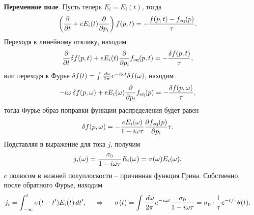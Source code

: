 \textbf{Переменное поле}. Пусть теперь $E_i = E_i (t)$, тогда
\begin{equation*}
	\left(
		\frac{\partial }{\partial t} + e E_i (t) \frac{\partial }{\partial p_i} 
	\right) f(p, t) = - \frac{f(p, t) - f_{\textnormal{eq}} (p)}{\tau}.
\end{equation*}
Переходя к линейному отклику, находим
\begin{equation*}
		\frac{\partial }{\partial t} \delta f(p, t) + e E_i (t) \frac{\partial }{\partial p_i} 
	 f_{\textnormal{eq}} (p, t) = - \frac{\delta f(p, t)}{\tau},
\end{equation*}
или переходя к Фурье $\delta f(t) = \int \frac{\, d \omega}{2\pi} e^{-i \omega t} \delta f(\omega)$, находим
\begin{equation*}
	 - i \omega \, \delta f(p, \omega) + e E_i (\omega) \frac{\partial }{\partial p_i}  f_{\textnormal{eq}} (p) = - \frac{\delta f(p, \omega)}{\tau},
\end{equation*}
тогда Фурье-образ поправки функции распределения будет равен
\begin{equation*}
	\delta f(p, \omega) = -  \frac{e E_i (\omega) }{1-i \omega \tau}  \frac{\partial f_{\textnormal{eq}}(p)}{\partial p_i} \tau .
\end{equation*}
Подставляя в выражение для тока $j$, получим
\begin{equation*}
	j_i (\omega) = \frac{\sigD}{1 - i \omega \tau} E_i (\omega) = \sigma(\omega) E_i (\omega),
\end{equation*}
c полюсом в нижней полуплоскости -- причинная функция Грина. Собственно, после обратного Фурье, находим
\begin{equation*}
	j_i = \int_{-\infty}^{t} \sigma(t-t') E_i (t) \d t',
	\hspace{0.5cm} \Rightarrow \hspace{0.5cm}
	\sigma(t) = \int \frac{\d \omega}{2\pi} e^{- i \omega t} \frac{\sigD}{1-i \omega \tau}  =  \sigD \cdot \frac{1}{\tau} e^{-t/\tau} \theta(t).
\end{equation*}
